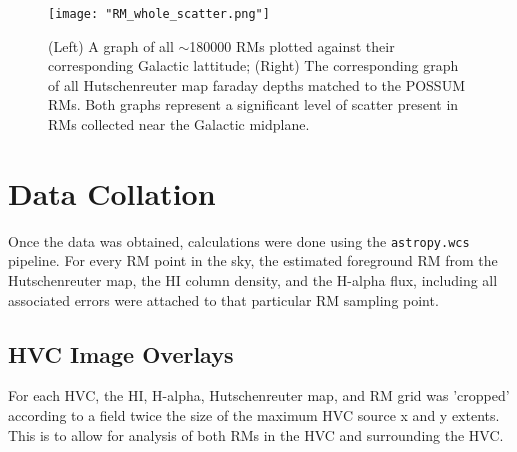 \begin{figure}
    \texttt{[image: "RM\_whole\_scatter.png"]}
    \centering
    \caption{(Left) A graph of all $\sim$180000 RMs plotted against their corresponding Galactic lattitude; (Right) The corresponding graph of all Hutschenreuter map faraday depths matched to the POSSUM RMs. Both graphs represent a significant level of scatter present in RMs collected near the Galactic midplane.}
    \label{fig:rm_scatter}
\end{figure}

\section{Data Collation}
\label{sec:collation}

Once the data was obtained, calculations were done using the \verb|astropy.wcs| pipeline. For every RM point in the sky, the estimated foreground RM from the Hutschenreuter map, the HI column density, and the H-alpha flux, including all associated errors were attached to that particular RM sampling point.

\subsection{HVC Image Overlays}
\label{ssec:hvc_snapshot}

For each HVC, the HI, H-alpha, Hutschenreuter map, and RM grid was 'cropped' according to a field twice the size of the maximum HVC source x and y extents. This is to allow for analysis of both RMs in the HVC and surrounding the HVC.


